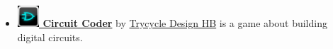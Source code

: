 \begin{itemize}
\item
\href{http://itunes.apple.com/at/app/circuit-coder/id492180472?mt=8}{\bf 
\includegraphics[width=0.8cm]{related/CircuitCoder.png} Circuit Coder} 
by 
\href{http://sweyla.com/}{Trycycle Design HB} is a game about building digital circuits.

\end{itemize}
